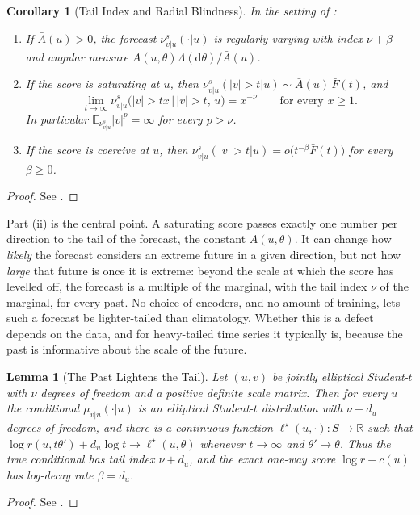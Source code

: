 \documentclass[11pt]{article}
\theoremstyle{plain}
\newtheorem{corollary}[theorem]{Corollary}
\newtheorem{lemma}[theorem]{Lemma}
\theoremstyle{definition}
\theoremstyle{remark}
\newcommand{\RR}{\mathbb{R}}
\newcommand{\E}{\mathbb{E}}
\newcommand{\Dd}{\mathrm{d}}
\newcommand{\abs}[1]{\left\lvert #1 \right\rvert}
\begin{document}
\begin{corollary}[Tail Index and Radial Blindness]
 \label{cor:tailindex}
 In the setting of :
 \begin{enumerate}[label=(\roman*)]
  \item If $\bar A(u)>0$, the forecast $\nu^{s}_{v\vert u}(\cdot\vert u)$ is
        regularly varying with index $\nu+\beta$ and angular measure
        $A(u,\theta)\Lambda(\Dd\theta)/\bar A(u)$.
  \item If the score is saturating at $u$, then
        $\nu^{s}_{v\vert u}(\abs{v}>t\vert u)\sim\bar A(u)\,\bar F(t)$, and
        \begin{equation*}
         \lim_{t\to\infty}\nu^{s}_{v\vert u}\bigl(\abs{v}>tx\,\big\vert\,\abs{v}>t,\,u\bigr)=x^{-\nu}
         \qquad\text{for every }x\ge1.
        \end{equation*}
        In particular $\E_{\nu^{s}_{v\vert u}}\abs{v}^{p}=\infty$ for every $p>\nu$.
  \item If the score is coercive at $u$, then
        $\nu^{s}_{v\vert u}(\abs{v}>t\vert u)=o\bigl(t^{-\beta}\bar F(t)\bigr)$ for
        every $\beta\ge0$.
 \end{enumerate}
\end{corollary}
\begin{proof}
 See .
\end{proof}

Part (ii) is the central point. A saturating score passes exactly one number
per direction to the tail of the forecast, the constant $A(u,\theta)$. It can
change how \emph{likely} the forecast considers an extreme future in a given
direction, but not how \emph{large} that future is once it is extreme: beyond
the scale at which the score has levelled off, the forecast is a multiple of
the marginal, with the tail index $\nu$ of the marginal, for every past. No
choice of encoders, and no amount of training, lets such a forecast be
lighter-tailed than climatology. Whether this is a defect depends on the data,
and for heavy-tailed time series it typically is, because the past is
informative about the scale of the future.

\begin{lemma}[The Past Lightens the Tail]
 \label{lem:tprocess}
 Let $(u,v)$ be jointly elliptical Student-$t$ with $\nu$ degrees of freedom
 and a positive definite scale matrix. Then for every $u$ the conditional
 $\mu_{v\vert u}(\cdot\vert u)$ is an elliptical Student-$t$ distribution with
 $\nu+d_u$ degrees of freedom, and there is a continuous function
 $\ell^{\star}(u,\cdot):S\to\RR$ such that
 $\log r(u,t\theta')+d_u\log t\to\ell^{\star}(u,\theta)$ whenever $t\to\infty$
 and $\theta'\to\theta$. Thus the true conditional has tail index $\nu+d_u$,
 and the exact one-way score $\log r+c(u)$ has log-decay rate $\beta=d_u$.
\end{lemma}
\begin{proof}
 See .
\end{proof}
\end{document}
